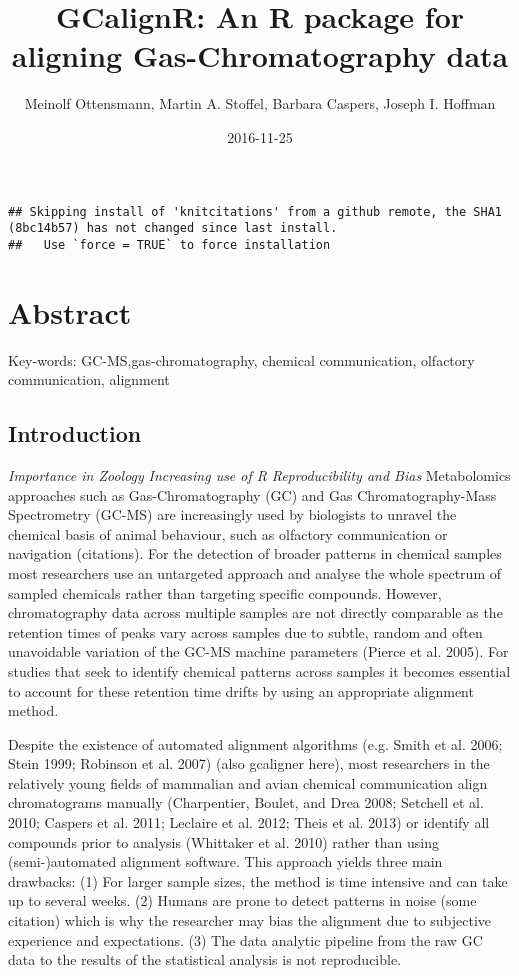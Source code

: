 \documentclass[]{article}
\title{GCalignR: An R package for aligning Gas-Chromatography data}
\author{Meinolf Ottensmann, Martin A. Stoffel, Barbara Caspers, Joseph I.
Hoffman}
\date{2016-11-25}
\begin{document}
\maketitle

\begin{verbatim}
## Skipping install of 'knitcitations' from a github remote, the SHA1 (8bc14b57) has not changed since last install.
##   Use `force = TRUE` to force installation
\end{verbatim}

\section{Abstract}\label{abstract}

Key-words: GC-MS,gas-chromatography, chemical communication, olfactory
communication, alignment

\subsection{Introduction}\label{introduction}

\emph{Importance in Zoology} \emph{Increasing use of R}
\emph{Reproducibility and Bias} Metabolomics approaches such as
Gas-Chromatography (GC) and Gas Chromatography-Mass Spectrometry (GC-MS)
are increasingly used by biologists to unravel the chemical basis of
animal behaviour, such as olfactory communication or navigation
(citations). For the detection of broader patterns in chemical samples
most researchers use an untargeted approach and analyse the whole
spectrum of sampled chemicals rather than targeting specific compounds.
However, chromatography data across multiple samples are not directly
comparable as the retention times of peaks vary across samples due to
subtle, random and often unavoidable variation of the GC-MS machine
parameters (Pierce et al. 2005). For studies that seek to identify
chemical patterns across samples it becomes essential to account for
these retention time drifts by using an appropriate alignment method.

Despite the existence of automated alignment algorithms (e.g. Smith et
al. 2006; Stein 1999; Robinson et al. 2007) (also gcaligner here), most
researchers in the relatively young fields of mammalian and avian
chemical communication align chromatograms manually (Charpentier,
Boulet, and Drea 2008; Setchell et al. 2010; Caspers et al. 2011;
Leclaire et al. 2012; Theis et al. 2013) or identify all compounds prior
to analysis (Whittaker et al. 2010) rather than using (semi-)automated
alignment software. This approach yields three main drawbacks: (1) For
larger sample sizes, the method is time intensive and can take up to
several weeks. (2) Humans are prone to detect patterns in noise (some
citation) which is why the researcher may bias the alignment due to
subjective experience and expectations. (3) The data analytic pipeline
from the raw GC data to the results of the statistical analysis is not
reproducible.
\end{document}
